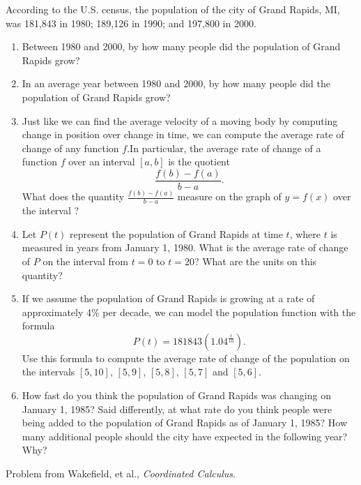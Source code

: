 \documentclass{ximera}
\begin{document}
\begin{exercise}
    According to the U.S. census, the population of the city of Grand Rapids, MI, was 181,843 in 1980; 189,126 in 1990; and 197,800 in 2000.
    \begin{enumerate}
        \item Between 1980 and 2000, by how many people did the population of Grand Rapids grow?
        \item In an average year between 1980 and 2000, by how many people did the population of Grand Rapids grow?
        \item Just like we can find the average velocity of a moving body by computing change in position over change in time, we can compute the average rate of change of any function $f$.In particular, the average rate of change of a function $f$ over an interval $[a,b]$ is the quotient
          \[\frac{f(b)-f(a)}{b-a}.\]
        What does the quantity  $\frac{f(b)-f(a)}{b-a}$ measure on the graph of $y=f(x)$ over the interval ?
        \item Let $P(t)$ represent the population of Grand Rapids at time $t$, where $t$ is measured in years from January 1, 1980. What is the average rate of change of $P$ on the interval from $t=0$ to $t=20$? What are the units on this quantity?
        \item If we assume the population of Grand Rapids is growing at a rate of approximately 4\% per decade, we can model the population function with the formula
        \[P(t)=181843(1.04^{\frac{t}{10}}).\]
        Use this formula to compute the average rate of change of the population on the intervals $[5,10]$, $[5,9]$, $[5,8]$, $[5,7]$ and $[5,6]$.
        \item How fast do you think the population of Grand Rapids was changing on January 1, 1985? Said differently, at what rate do you think people were being added to the population of Grand Rapids as of January 1, 1985? How many additional people should the city have expected in the following year? Why?
  \end{enumerate}
  Problem from Wakefield, et al., \textit {Coordinated Calculus}.
\end{exercise}
\end{document}
